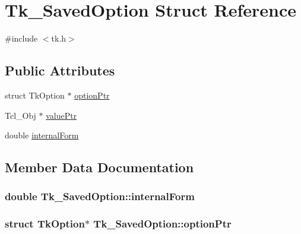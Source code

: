 \hypertarget{struct_tk___saved_option}{}\section{Tk\+\_\+\+Saved\+Option Struct Reference}
\label{struct_tk___saved_option}


{\ttfamily \#include $<$tk.\+h$>$}

\subsection*{Public Attributes}
\begin{DoxyCompactItemize}
\item 
struct Tk\+Option $\ast$ \hyperlink{struct_tk___saved_option_aea85e3eba9e5265f663bb85ef0d2dcba}{option\+Ptr}
\item 
Tcl\+\_\+\+Obj $\ast$ \hyperlink{struct_tk___saved_option_a49f053db9eeb33e8ecab8e2c534b73ab}{value\+Ptr}
\item 
double \hyperlink{struct_tk___saved_option_ad62e65b29022731ae9a874ab98aecce8}{internal\+Form}
\end{DoxyCompactItemize}


\subsection{Member Data Documentation}
\subsubsection[{\texorpdfstring{internal\+Form}{internalForm}}]{\setlength{\rightskip}{0pt plus 5cm}double Tk\+\_\+\+Saved\+Option\+::internal\+Form}\hypertarget{struct_tk___saved_option_ad62e65b29022731ae9a874ab98aecce8}{}\label{struct_tk___saved_option_ad62e65b29022731ae9a874ab98aecce8}
\subsubsection[{\texorpdfstring{option\+Ptr}{optionPtr}}]{\setlength{\rightskip}{0pt plus 5cm}struct Tk\+Option$\ast$ Tk\+\_\+\+Saved\+Option\+::option\+Ptr}\hypertarget{struct_tk___saved_option_aea85e3eba9e5265f663bb85ef0d2dcba}{}\label{struct_tk___saved_option_aea85e3eba9e5265f663bb85ef0d2dcba}
